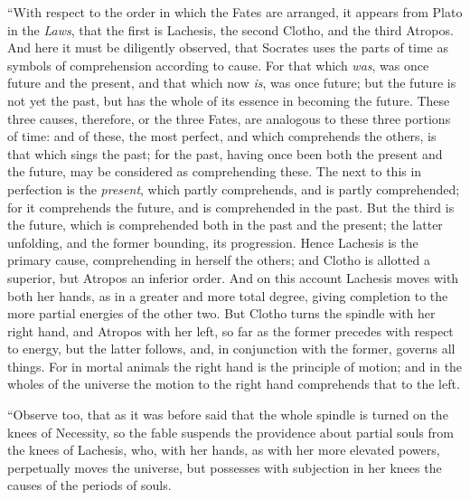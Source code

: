 \documentclass[12pt]{article}
\begin{document}
{``With respect to the order in which the Fates are arranged, it appears from
Plato in the \textit{Laws}, that the first is Lachesis, the second Clotho, and
the third Atropos. And here it must be diligently observed, that Socrates uses
the parts of time as symbols of comprehension according to cause. For that
which \textit{was}, was once future and the present, and that which now
\textit{is}, was once future; but the future is not yet the past, but has the
whole of its essence in becoming the future. These three causes, therefore, or
the three Fates, are analogous to these three portions of time: and of these,
the most perfect, and which comprehends the others, is that which sings the
past; for the past, having once been both the present and the future, may be
considered as comprehending these. The next to this in perfection is the
\textit{present}, which partly comprehends, and is partly comprehended; for it
comprehends the future, and is comprehended in the past. But the third is the
future, which is comprehended both in the past and the present; the latter
unfolding, and the former bounding, its progression. Hence Lachesis is the
primary cause, comprehending in herself the others; and Clotho is allotted a
superior, but Atropos an inferior order. And on this account Lachesis moves
with both her hands, as in a greater and more total degree, giving completion
to the more partial energies of the other two. But Clotho turns the spindle
with her right hand, and Atropos with her left, so far as the former precedes
with respect to energy, but the latter follows, and, in conjunction with the
former, governs all things. For in mortal animals the right hand is the
principle of motion; and in the wholes of the universe the motion to the right
hand comprehends that to the left.

``Observe too, that as it was before said that the whole spindle is turned on
the knees of Necessity, so the fable suspends the providence about partial
souls from the knees of Lachesis, who, with her hands, as with her more
elevated powers, perpetually moves the universe, but possesses with subjection
in her knees the causes of the periods of souls.

}
\end{document}
